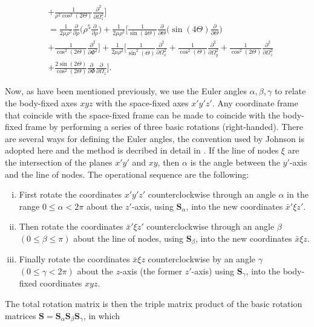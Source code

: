 \begin{equation}
\begin{aligned}
&+ \frac{1}{\rho^2\cos^2(2\Theta)}\frac{\partial^2}{\partial\Omega^2_z}\Bigg]\\
&=\frac{1}{2\mu\rho^5}\frac{\partial}{\partial\rho}\Bigg(\rho^5\frac{\partial}{\partial\rho}\Bigg) + \frac{1}{2\mu\rho^2}\Bigg[\frac{1}{\sin(4\Theta)}\frac{\partial}{\partial\Theta}\Bigg(\sin(4\Theta)\frac{\partial}{\partial\Theta}\Bigg)\\
&+\frac{1}{\cos^2(2\Theta)}\frac{\partial^2}{\partial\Phi^2} \Bigg]+\frac{1}{2\mu\rho^2}\Bigg[\frac{1}{\sin^2(\Theta)}\frac{\partial^2}{\partial\Omega^2_x} + \frac{1}{\cos^2(\Theta)}\frac{\partial^2}{\partial\Omega^2_y} + \frac{1}{\cos^2(2\Theta)}\frac{\partial^2}{\partial\Omega^2_z}\\
&+ \frac{2\sin(2\Theta)}{\cos^2(2\Theta)}\frac{\partial}{\partial\Phi}\frac{\partial}{\partial\Omega_z}\Bigg].
\end{aligned}
\end{equation}

Now, as have been mentioned previously, we use the Euler angles $\alpha,\beta,\gamma$ to relate the body-fixed axes $xyz$ with the space-fixed axes $x'y'z'$. Any coordinate frame that coincide with the space-fixed frame can be made to coincide with the body-fixed frame by performing a series of three basic rotations (right-handed). There are several ways for defining the Euler angles, the convention used by Johnson \cite{Johnson_1983} is adopted here and the method is decribed in detail in \cite{arfken_weber_harris_2013}. If the line of nodes $\xi$ are the intersection of the planes $x'y'$ and $xy$, then $\alpha$ is the angle between the $y'$-axis and the line of nodes. The operational sequence are the following:

\begin{enumerate}[(i)]  
	\item First rotate the coordinates $x'y'z'$ counterclockwise through an angle $\alpha$ in the range $0 \leq \alpha < 2\pi$ about the $z'$-axis, using $\mathbf{S}_{\alpha}$, into the new coordinates $\bar{x}'\xi z'$.
	\item Then rotate the coordinates $\bar{x}' \xi z'$ counterclockwise through an angle $\beta$ $(0 \leq \beta \leq \pi)$ about the line of nodes, using $\mathbf{S}_{\beta}$, into the new coordinates $\bar{x} \xi z$.
	\item Finally rotate the coordinates $\bar{x} \xi z$ counterclockwise by an angle $\gamma$ $(0 \leq \gamma < 2\pi)$ about the $z$-axis (the former $z'$-axis) using $\mathbf{S}_{\gamma}$, into the body-fixed coordinates $xyz$.
\end{enumerate}   
The total rotation matrix is then the triple matrix product of the basic rotation matrices $\mathbf{S} = \mathbf{S}_{\alpha}\mathbf{S}_{\beta}\mathbf{S}_{\gamma}$, in which

